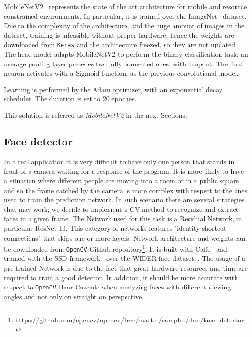 \documentclass[10pt,twocolumn,letterpaper]{article}
\begin{document}
MobileNetV2~\cite{s2018mobilenetv2} represents the state of the art architecture for mobile and resource constrained environments. In particular, it is trained over the ImageNet~\cite{imagenet_cvpr09} dataset. Due to the complexity of the architecture, and the huge amount of images in the dataset, training is infeasible without proper hardware: hence the weights are downloaded from \texttt{Keras} and the architecture freezed, so they are not updated.
The head model adapts MobileNetV2 to perform the binary classification task: an average pooling layer precedes two fully connected ones, with dropout. The final neuron activates with a Sigmoid function, as the previous convolutional model.

Learning is performed by the Adam optimizer, with an exponential decay scheduler. The duration is set to 20 epoches.

This solution is referred as \textit{MobileNetV2} in the next Sections.

\subsection{Face detector}
In a real application it is very difficult to have only one person that stands in front of a camera waiting for a response of the program. It is more likely to have a situation where different people are moving into a room or in a public square and so the frame catched by the camera is more complex with respect to the ones used to train the prediction network. In such scenario there are several strategies that may work; we decide to implement a CV method to recognize and extract faces in a given frame. 
The Network used for this task is a Residual Network, in particular ResNet-10. This category of networks features "identity shortcut connections" that skips one or more layers. Network architecture and weights can be downloaded from \texttt{OpenCV} Github repository\footnote{\href{https://github.com/opencv/opencv/tree/master/samples/dnn/face_detector}{https://github.com/opencv/opencv/tree/master/samples/dnn/face\_detector}}. It is built with Caffe~\cite{jia2014caffe} and trained with the SSD framework~\cite{liu2016ssd} over the WIDER face dataset~\cite{yang2016wider}. The usage of a pre-trained Network is due to the fact that great hardware resources and time are required to train a good detector. In addition, it should be more accurate with respect to \texttt{OpenCV} Haar Cascade when analyzing faces with different viewing angles and not only on straight on perspective.
\end{document}
